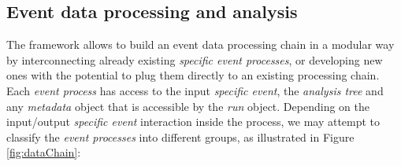 \subsection{Event data processing and analysis}

The framework allows to build an event data processing chain in a modular way by interconnecting already existing \emph{specific event processes}, or developing new ones with the potential to plug them directly to an existing processing chain. Each \emph{event process} has access to the input \emph{specific event}, the \emph{analysis tree} and any \emph{metadata} object that is accessible by the \emph{run} object. Depending on the input/output \emph{specific event} interaction inside the process, we may attempt to classify the \emph{event processes} into different groups, as illustrated in Figure\,\ref{fig:dataChain}:

